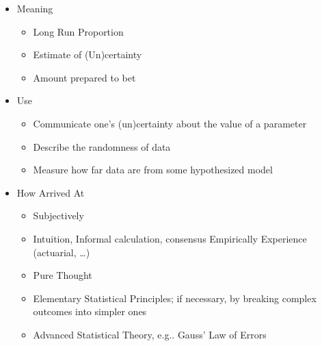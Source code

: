 \documentclass[]{book}
\providecommand{\tightlist}{%
  \setlength{\itemsep}{0pt}\setlength{\parskip}{0pt}}
\begin{document}
\begin{itemize}
\item
  Meaning

  \begin{itemize}
  \tightlist
  \item
    Long Run Proportion
  \item
    Estimate of (Un)certainty
  \item
    Amount prepared to bet
  \end{itemize}
\item
  Use

  \begin{itemize}
  \tightlist
  \item
    Communicate one's (un)certainty about the value of a parameter
  \item
    Describe the randomness of data
  \item
    Measure how far data are from some hypothesized model
  \end{itemize}
\item
  How Arrived At

  \begin{itemize}
  \tightlist
  \item
    Subjectively
  \item
    Intuition, Informal calculation, consensus Empirically
    Experience (actuarial, \ldots{})
  \item
    Pure Thought
  \item
    Elementary Statistical Principles; if necessary, by breaking complex outcomes into simpler ones
  \item
    Advanced Statistical Theory, e.g.. Gauss' Law of Errors
  \end{itemize}

  \begin{figure}


\end{figure}
\end{itemize}
\end{document}
